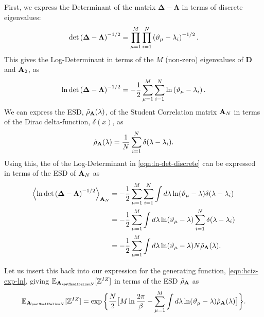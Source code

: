 First, we express the Determinant of the matrix $\mathbf{\Delta}-\mathbf{\Lambda}$ in terms of discrete eigenvalues:
\begin{equation}
\label{eqn:det-discrete}
    \det\left(\mathbf{\Delta}-\mathbf{\Lambda}\right)^{-1/2}=\prod_{\mu=1}^{M}\prod_{i=1}^{N}\left(\DeltaMu-\lambda_{i}\right)^{-1/2}  .
\end{equation}
%
This gives the Log-Determinant in terms of the $M$ (non-zero)
eigenvalues of $\mathbf{D}$ and $\mathbf{A}_{2}$, as
\begin{equation}
\label{eqn:ln-det-discrete}
    \ln\det\left(\mathbf{\Delta}-\mathbf{\Lambda}\right)^{-1/2}=-\dfrac{1}{2}\sum_{\mu=1}^{M}\sum_{i=1}^{N}\ln\left(\DeltaMu-\lambda_{i}\right)  .
\end{equation}
%
We can express %
the ESD, $\tilde\rho_{\mathbf{A}}(\lambda)$, of the 
Student Correlation 
matrix
$\mathbf{A}_N$ in terms of the Dirac delta-function, $\delta(x)$, as
\begin{equation}
\label{eqn:rho-emp}
    \tilde\rho_{\AMAT}(\lambda)=\frac{1}{N}\sum_{i=1}^{N}\delta(\lambda-\lambda_{i})  .
\end{equation}
Using this, the \ExpectedValue of the Log-Determinant 
in \ref{eqn:ln-det-discrete}
can be expressed in terms of the ESD of
$\mathbf{A}_N$ as
\begin{align}
\nonumber
\Expected[\AMAT_N]{\ln\det\left(\mathbf{\Delta}-\mathbf{\Lambda}\right)^{-1/2}}
   & = -\dfrac{1}{2}\sum_{\mu=1}^{M}\sum_{i=1}^{N}\int
       d\lambda\ln(\DeltaMu-\lambda)\delta(\lambda-\lambda_{i}) \\ 
\nonumber
   & = -\dfrac{1}{2}\sum_{\mu=1}^{M}\int
       d\lambda\ln(\DeltaMu-\lambda)\sum_{i=1}^{N}\delta(\lambda-\lambda_{i}) \\ 
\label{eqn:ln-det-rho}
   & = -\dfrac{1}{2}\sum_{\mu=1}^{M}\int
       d\lambda\ln(\DeltaMu-\lambda)
       N\tilde\rho_{\AMAT}(\lambda)  .
\end{align}

Let us insert this back into our
expression for the generating function,
\ref{eqn:hciz-exp-ln},   %
giving
$\EZDATWO$ in terms of the ESD $\tilde{\rho}_{\mathbf{A}}$ as
\begin{equation}
\label{eqn:Z-rho}
    \EZDATWO=\exp\bigg\{\dfrac{N}{2}\big[M\ln\dfrac{2\pi}{\beta}-\sum_{\mu=1}^{M}\int
        d\lambda\ln(\DeltaMu-\lambda)\tilde{\rho}_{\AMAT}(\lambda)\big]\bigg\}  .
\end{equation}


